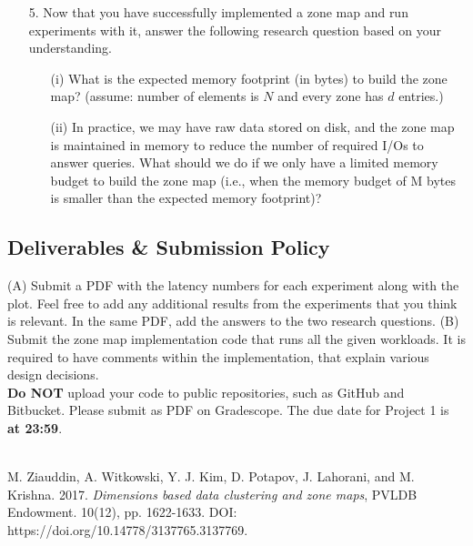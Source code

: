\documentclass[12pt,a4paper,twoside]{article}
\newcommand{\assignmenttype}{Project}       %
\newcommand{\assignmentnumber}{1}           %
\begin{document}
\begin{enumerate}
    \item[5.] Now that you have successfully implemented a zone map and run experiments with it, answer the following research question based on your understanding. \begin{enumerate}
        \item[(i)] What is the expected memory footprint (in bytes) to build the zone map? (assume: number of elements is $N$ and every zone has $d$ entries.) 
        \item[(ii)] In practice, we may have raw data stored on disk, and the zone map is maintained in memory to reduce the number of required I/Os to answer queries. What should we do if we only have a limited memory budget to build the zone map (i.e., when the memory budget of M bytes is smaller than the expected memory footprint)? 
    \end{enumerate}
\end{enumerate}

\subsection*{Deliverables \& Submission Policy} 
(A) Submit a PDF with the latency numbers for each experiment along with the plot. 
Feel free to add any additional results from the experiments that you think is relevant. 
In the same PDF, add the answers to the two research questions. 
(B) Submit the zone map implementation code that runs all the given workloads. 
It is required to have comments within the implementation, that explain various design decisions. \\ 

\noindent \textbf{Do NOT} upload your code to public repositories, such as GitHub and Bitbucket. 
Please submit as PDF on Gradescope. 
The due date for \assignmenttype{} \assignmentnumber{} is \textbf{ at 23:59}. \\\\



\begin{thebibliography}{9}
M. Ziauddin, A. Witkowski, Y. J. Kim, D. Potapov, J. Lahorani, and M. Krishna. 2017. \emph{Dimensions based data clustering and zone maps}, PVLDB Endowment. 10(12), pp. 1622-1633. DOI: https://doi.org/10.14778/3137765.3137769.
\end{thebibliography}
\end{document}
